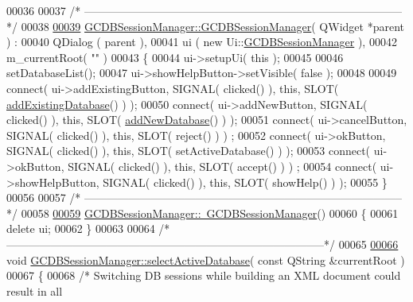 \begin{DoxyCode}
00036 
00037 \textcolor{comment}{/*
      --------------------------------------------------------------------------------------*/}
00038 
\hypertarget{gcdbsessionmanager_8cpp_source_l00039}{}\hyperlink{class_g_c_d_b_session_manager_ae9bbc80ab3d7235f804393ea1b4e9f36}{00039} \hyperlink{class_g_c_d_b_session_manager_ae9bbc80ab3d7235f804393ea1b4e9f36}{GCDBSessionManager::GCDBSessionManager}( QWidget *parent ) :
00040   QDialog      ( parent ),
00041   ui           ( new Ui::\hyperlink{class_g_c_d_b_session_manager}{GCDBSessionManager} ),
00042   m\_currentRoot( \textcolor{stringliteral}{""} )
00043 \{
00044   ui->setupUi( \textcolor{keyword}{this} );
00045 
00046   setDatabaseList();
00047   ui->showHelpButton->setVisible( \textcolor{keyword}{false} );
00048 
00049   connect( ui->addExistingButton, SIGNAL( clicked() ), \textcolor{keyword}{this}, SLOT( 
      \hyperlink{class_g_c_d_b_session_manager_a52f3407b7ad5cac7c8c422d2528b28fc}{addExistingDatabase}() ) );
00050   connect( ui->addNewButton,      SIGNAL( clicked() ), \textcolor{keyword}{this}, SLOT( 
      \hyperlink{class_g_c_d_b_session_manager_ad029ca4ec8ffff788a281f1b3f3eee71}{addNewDatabase}() ) );
00051   connect( ui->cancelButton,      SIGNAL( clicked() ), \textcolor{keyword}{this}, SLOT( reject() ) )
      ;
00052   connect( ui->okButton,          SIGNAL( clicked() ), \textcolor{keyword}{this}, SLOT( 
      setActiveDatabase() ) );
00053   connect( ui->okButton,          SIGNAL( clicked() ), \textcolor{keyword}{this}, SLOT( accept() ) )
      ;
00054   connect( ui->showHelpButton,    SIGNAL( clicked() ), \textcolor{keyword}{this}, SLOT( showHelp() )
       );
00055 \}
00056 
00057 \textcolor{comment}{/*
      --------------------------------------------------------------------------------------*/}
00058 
\hypertarget{gcdbsessionmanager_8cpp_source_l00059}{}\hyperlink{class_g_c_d_b_session_manager_a95698026afd73f32557483f3fc19b419}{00059} \hyperlink{class_g_c_d_b_session_manager_a95698026afd73f32557483f3fc19b419}{GCDBSessionManager::~GCDBSessionManager}()
00060 \{
00061   \textcolor{keyword}{delete} ui;
00062 \}
00063 
00064 \textcolor{comment}{/*
      --------------------------------------------------------------------------------------*/}
00065 
\hypertarget{gcdbsessionmanager_8cpp_source_l00066}{}\hyperlink{class_g_c_d_b_session_manager_ac4e5a25619ee77bc9307d3428bfd345d}{00066} \textcolor{keywordtype}{void} \hyperlink{class_g_c_d_b_session_manager_ac4e5a25619ee77bc9307d3428bfd345d}{GCDBSessionManager::selectActiveDatabase}( \textcolor{keyword}{const} QString &currentRoot )
00067 \{
00068   \textcolor{comment}{/* Switching DB sessions while building an XML document could result in all
}
\end{DoxyCode}
